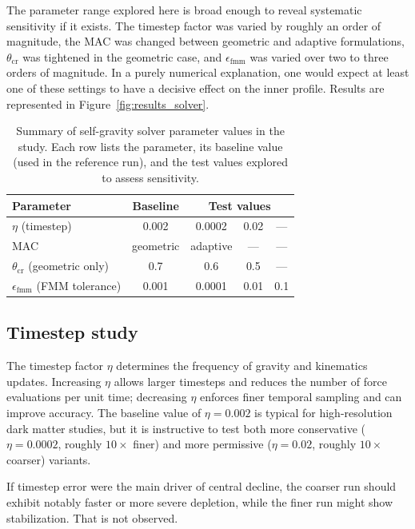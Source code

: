 The parameter range explored here is broad enough to reveal systematic sensitivity if it exists. The timestep factor was varied by roughly an order of magnitude, the MAC was changed between geometric and adaptive formulations, $\theta_{\mathrm{cr}}$ was tightened in the geometric case, and $\epsilon_{\mathrm{fmm}}$ was varied over two to three orders of magnitude. In a purely numerical explanation, one would expect at least one of these settings to have a decisive effect on the inner profile. Results are represented in Figure~\ref{fig:results_solver}.

\begin{table}[H]
\centering
\caption{Summary of self-gravity solver parameter values in the study. Each row lists the parameter, its baseline value (used in the reference run), and the test values explored to assess sensitivity.}
\label{tab:solver_parameters}
\begin{tabular}{lcccc}
\hline
\textbf{Parameter} & \textbf{Baseline} & \multicolumn{3}{c}{\textbf{Test values}} \\
\hline
$\eta$ (timestep) & 0.002 & 0.0002 & 0.02 & — \\
MAC & geometric & adaptive & — & — \\
$\theta_{\mathrm{cr}}$ (geometric only) & 0.7 & 0.6 & 0.5 & — \\
$\epsilon_{\mathrm{fmm}}$ (FMM tolerance) & 0.001 & 0.0001 & 0.01 & 0.1 \\
\hline
\end{tabular}
\end{table}

\subsection{Timestep study}

The timestep factor $\eta$ determines the frequency of gravity and kinematics updates. Increasing $\eta$ allows larger timesteps and reduces the number of force evaluations per unit time; decreasing $\eta$ enforces finer temporal sampling and can improve accuracy. The baseline value of $\eta = 0.002$ is typical for high-resolution dark matter studies, but it is instructive to test both more conservative ($\eta = 0.0002$, roughly $10\times$ finer) and more permissive ($\eta = 0.02$, roughly $10\times$ coarser) variants.

If timestep error were the main driver of central decline, the coarser run should exhibit notably faster or more severe depletion, while the finer run might show stabilization. That is not observed.

